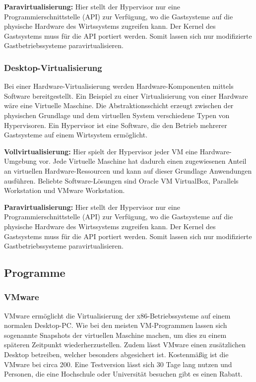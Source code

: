 \textbf{Paravirtualisierung:} Hier stellt der Hypervisor nur eine Programmierschnittstelle (API) zur Verfügung, wo die Gastsysteme auf die physische Hardware des Wirtssystems zugreifen kann. Der Kernel des Gastsystems muss für die API portiert werden. Somit lassen sich nur modifizierte Gastbetriebssysteme paravirtualisieren. 

\subsubsection{Desktop-Virtualisierung}
Bei einer Hardware-Virtualisierung werden Hardware-Komponenten mittels Software bereitgestellt. Ein Beispiel zu einer Virtualisierung von einer Hardware wäre eine Virtuelle Maschine. Die Abstraktionsschicht erzeugt zwischen der physischen Grundlage und dem virtuellen System verschiedene Typen von Hypervisoren. Ein Hypervisor ist eine Software, die den Betrieb mehrerer Gastsysteme auf einem Wirtsystem ermöglicht.

\textbf{Vollvirtualisierung:} Hier spielt der Hypervisor jeder VM eine Hardware-Umgebung vor. Jede Virtuelle Maschine hat dadurch einen zugewiesenen Anteil an virtuellen Hardware-Ressourcen und kann auf dieser Grundlage Anwendungen ausführen. Beliebte Software-Lösungen sind Oracle VM VirtualBox, Parallels Workstation und VMware Workstation.

\textbf{Paravirtualisierung:} Hier stellt der Hypervisor nur eine Programmierschnittstelle (API) zur Verfügung, wo die Gastsysteme auf die physische Hardware des Wirtssystems zugreifen kann. Der Kernel des Gastsystems muss für die API portiert werden. Somit lassen sich nur modifizierte Gastbetriebssysteme paravirtualisieren. \textcite{WasIstVirtualisierung}

\subsection{Programme}
\subsubsection{VMware}
VMware ermöglicht die Virtualisierung der x86-Betriebssysteme auf einem normalen Desktop-PC. Wie bei den meisten VM-Programmen lassen sich sogenannte Snapshots der virtuellen Maschine machen, um dies zu einem späteren Zeitpunkt wiederherzustellen. Zudem lässt VMware einen zusätzlichen Desktop betreiben, welcher besonders abgesichert ist. Kostenmäßig ist die VMware bei circa 200\texteuro{}. Eine Testversion lässt sich 30 Tage lang nutzen und Personen, die eine Hochschule oder Universität besuchen gibt es einen Rabatt. 

